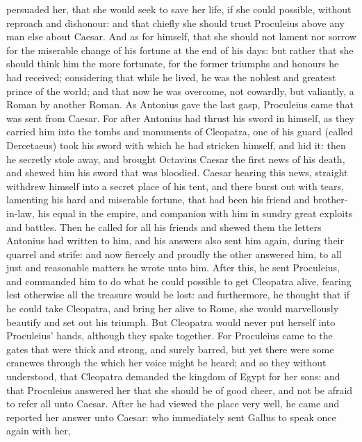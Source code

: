 \documentclass{book}
\begin{document}
persuaded her, that she would seek to save her life, if she could
possible, without reproach and dishonour: and that chiefly she should
trust Proculeius above any man else about Caesar. And as for himself,
that she should not lament nor sorrow for the miserable change of
his fortune at the end of his days: but rather that she should think
him the more fortunate, for the former triumphs and honours he had
received; considering that while he lived, he was the noblest and
greatest prince of the world; and that now he was overcome, not
cowardly, but valiantly, a Roman by another Roman.
As Antonius gave the last gasp, Proculeius came that was sent from
Caesar. For after Antonius had thrust his sword in himself, as they
carried him into the tombs and monuments of Cleopatra, one of his
guard (called Dercetaeus) took his sword with which he had stricken
himself, and hid it: then he secretly stole away, and brought 
Octavius Caesar the first news of his death, and shewed him his sword that
was bloodied. Caesar hearing this news, straight withdrew himself into a secret
place of his tent, and there burst out with tears, lamenting his hard
and miserable fortune, that had been his friend and brother-in-law,
his equal in the empire, and companion with him in sundry great
exploits and battles. Then he called for all his friends and shewed
them the letters Antonius had written to him, and his answers also
sent him again, during their quarrel and strife: and now fiercely and
proudly the other answered him, to all just and reasonable matters
he wrote unto him. After  this, he sent Proculeius, and commanded
him to do what he could possible to get Cleopatra alive, fearing lest
otherwise all the treasure would be lost: and furthermore, he thought
that if he could take Cleopatra, and bring her alive to Rome, she
would marvellously beautify and set out his triumph. But Cleopatra
would never put herself into Proculeius' hands, although they spake
together. For Proculeius came to the gates that were thick and strong,
and surely barred, but yet there were some cranewes through the
which her voice might be heard; and so they without understood,
that Cleopatra demanded the kingdom of Egypt for her sons: and that
Proculeius answered her that she should be of good cheer, and not be
afraid to refer all unto Caesar.
After he had viewed the place very well, he came and reported her
answer unto Caesar: who immediately sent Gallus to speak once again with her,
\end{document}
